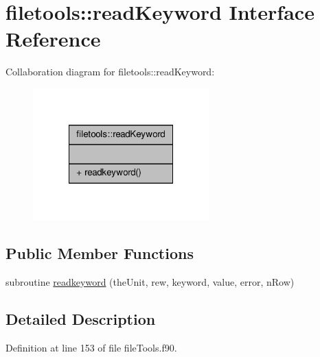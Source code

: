 \hypertarget{interfacefiletools_1_1read_keyword}{\section{filetools\-:\-:read\-Keyword Interface Reference}
\label{interfacefiletools_1_1read_keyword}
}


Collaboration diagram for filetools\-:\-:read\-Keyword\-:\nopagebreak
\begin{figure}[H]
\begin{center}
\leavevmode
\includegraphics[width=192pt]{interfacefiletools_1_1read_keyword__coll__graph}
\end{center}
\end{figure}
\subsection*{Public Member Functions}
\begin{DoxyCompactItemize}
\item 
subroutine \hyperlink{interfacefiletools_1_1read_keyword_a40ca3283fc0c58b6f9ab7d2d921b6f5a}{readkeyword} (the\-Unit, rew, keyword, value, error, n\-Row)
\end{DoxyCompactItemize}


\subsection{Detailed Description}


Definition at line 153 of file file\-Tools.\-f90.



